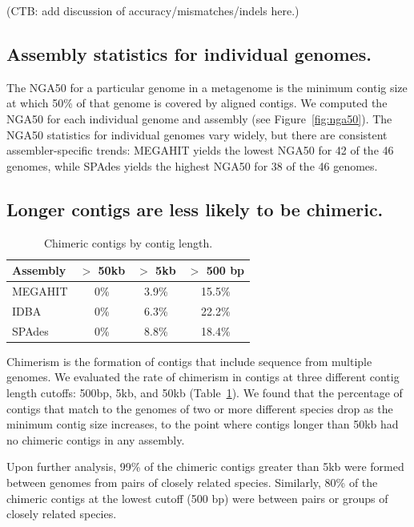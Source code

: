 \documentclass[10pt,a4paper,twocolumn]{article}
\begin{document}
(CTB: add discussion of accuracy/mismatches/indels here.)

\subsection*{Assembly statistics for individual genomes.}

The NGA50 for a particular genome in a metagenome is the minimum
contig size at which 50\% of that genome is covered by aligned contigs.
We computed the NGA50 for each individual genome and assembly (see
Figure~\ref{fig:nga50}).  The NGA50 statistics for individual genomes
vary widely, but there are consistent assembler-specific trends:
MEGAHIT yields the lowest NGA50 for 42 of the 46 genomes, while SPAdes
yields the highest NGA50 for 38 of the 46 genomes.

\subsection*{Longer contigs are less likely to be chimeric.}

\begin{table}[!h]
\centering
\caption{Chimeric contigs by contig length.}
\begin{tabular}{|l|c|c|c|}\hline
\textbf{Assembly} & \textbf {$>$ 50kb} & \textbf {$>$ 5kb} & \textbf{$>$ 500 bp}
\\ \hline

MEGAHIT      & 0\% & 3.9\% & 15.5\% \\ 
IDBA   & 0\% & 6.3\% & 22.2\% \\
SPAdes    & 0\% & 8.8\% & 18.4\% \\
\hline

\end{tabular}
\label{table:contig-chimera}

\end{table}

Chimerism is the formation of contigs that include sequence from multiple
genomes.
We evaluated the rate of chimerism
in contigs at three different contig length cutoffs: 500bp, 5kb,
and 50kb (Table~\ref{table:contig-chimera}).  We found that the
percentage of contigs that match to the genomes of two or more
different species drop as the minimum contig size increases, to the
point where contigs longer than 50kb had no chimeric contigs in any
assembly.


Upon further analysis, 99\% of the chimeric contigs greater than 5kb
were formed between genomes from pairs of closely related species.
Similarly, 80\% of the chimeric contigs at the lowest cutoff (500 bp)
were between pairs or groups of closely related species.
\end{document}
